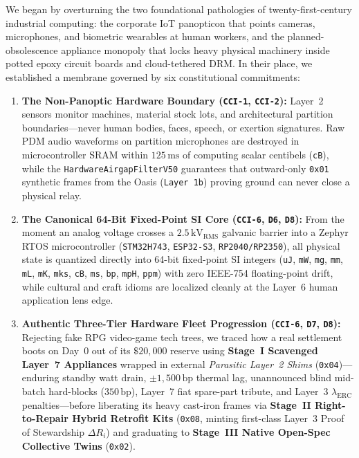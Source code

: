 We began by overturning the two foundational pathologies of twenty-first-century industrial computing: the corporate IoT panopticon that points cameras, microphones, and biometric wearables at human workers, and the planned-obsolescence appliance monopoly that locks heavy physical machinery inside potted epoxy circuit boards and cloud-tethered DRM. In their place, we established a membrane governed by six constitutional commitments:
\begin{enumerate}
    \item \textbf{The Non-Panoptic Hardware Boundary (\texttt{CCI-1}, \texttt{CCI-2}):} Layer~2 sensors monitor machines, material stock lots, and architectural partition boundaries---never human bodies, faces, speech, or exertion signatures. Raw PDM audio waveforms on partition microphones are destroyed in microcontroller SRAM within $125\,\mathrm{ms}$ of computing scalar centibels (\texttt{cB}), while the \texttt{HardwareAirgapFilterV50} guarantees that outward-only \texttt{0x01} synthetic frames from the Oasis (\texttt{Layer 1b}) proving ground can never close a physical relay.
    \item \textbf{The Canonical 64-Bit Fixed-Point SI Core (\texttt{CCI-6}, \texttt{D6}, \texttt{D8}):} From the moment an analog voltage crosses a $2.5\,\mathrm{kV}_{\mathrm{RMS}}$ galvanic barrier into a Zephyr RTOS microcontroller (\texttt{STM32H743}, \texttt{ESP32-S3}, \texttt{RP2040/RP2350}), all physical state is quantized directly into 64-bit fixed-point SI integers (\texttt{uJ}, \texttt{mW}, \texttt{mg}, \texttt{mm}, \texttt{mL}, \texttt{mK}, \texttt{mks}, \texttt{cB}, \texttt{ms}, \texttt{bp}, \texttt{mpH}, \texttt{ppm}) with zero IEEE-754 floating-point drift, while cultural and craft idioms are localized cleanly at the Layer~6 human application lens edge.
    \item \textbf{Authentic Three-Tier Hardware Fleet Progression (\texttt{CCI-6}, \texttt{D7}, \texttt{D8}):} Rejecting fake RPG video-game tech trees, we traced how a real settlement boots on Day~0 out of its $\$20{,}000$ reserve using \textbf{Stage~I Scavenged Layer~7 Appliances} wrapped in external \textit{Parasitic Layer~2 Shims} (\texttt{0x04})---enduring standby watt drain, $\pm 1{,}500\,\mathrm{bp}$ thermal lag, unannounced blind mid-batch hard-blocks ($350\,\mathrm{bp}$), Layer~7 fiat spare-part tribute, and Layer~3 $\lambda_{\mathrm{ERC}}$ penalties---before liberating its heavy cast-iron frames via \textbf{Stage~II Right-to-Repair Hybrid Retrofit Kits} (\texttt{0x08}, minting first-class Layer~3 Proof of Stewardship $\Delta R_i$) and graduating to \textbf{Stage~III Native Open-Spec Collective Twins} (\texttt{0x02}).

\end{enumerate}
